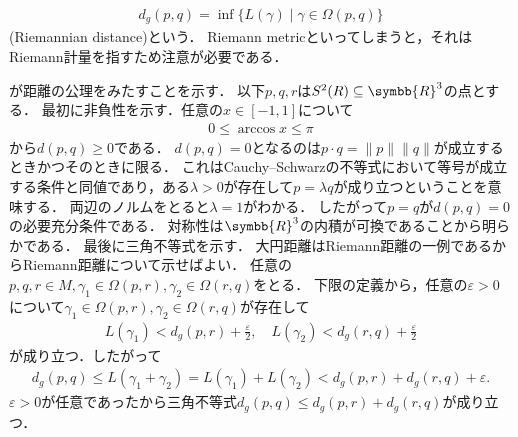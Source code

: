 \documentclass{ltjsbook}
\begin{document}
\begin{align}
    d_g(p, q) = \inf \{L(\gamma) \mid \gamma \in \Omega(p, q)\}
\end{align}
(Riemannian distance)という．
Riemann metricといってしまうと，それはRiemann計量を指すため注意が必要である．


が距離の公理をみたすことを示す．
以下\(p, q, r\)は\(S^2(R) \subseteq \symbb{R}^3\)の点とする．
最初に非負性を示す．任意の\(x \in [-1 , 1]\)について
\begin{align*}
    0 \leq \arccos x \leq \pi
\end{align*}
から\(d(p, q) \geq 0\)である．
\(d(p, q) = 0\)となるのは\(p \cdot q = \lVert p \rVert \lVert q \rVert\)が成立するときかつそのときに限る．
これはCauchy--Schwarzの不等式において等号が成立する条件と同値であり，ある\(\lambda > 0\)が存在して\(p = \lambda q\)が成り立つということを意味する．
両辺のノルムをとると\(\lambda = 1\)がわかる．
したがって\(p = q\)が\(d(p, q) = 0\)の必要充分条件である．
対称性は\(\symbb{R}^3\)の内積が可換であることから明らかである．
最後に三角不等式を示す．
大円距離はRiemann距離の一例であるからRiemann距離について示せばよい．
任意の\(p, q, r\in M, \gamma_1 \in \Omega(p, r), \gamma_2 \in \Omega(r, q)\)をとる．
下限の定義から，任意の\(\varepsilon > 0\)について\(\gamma_1 \in \Omega(p, r), \gamma_2 \in \Omega(r, q)\)が存在して
\begin{gather*}
    L(\gamma_1) < d_g(p, r) + \frac{\varepsilon}{2},
    \quad
    L(\gamma_2) < d_g(r, q) + \frac{\varepsilon}{2}
\end{gather*}
が成り立つ．したがって
\begin{align*}
    d_g(p, q) \leq L(\gamma_1 + \gamma_2)
            = L(\gamma_1) + L(\gamma_2)
            < d_g(p, r) + d_g(r, q) + \varepsilon.
\end{align*}
\(\varepsilon > 0\)が任意であったから三角不等式\(d_g(p, q) \leq d_g(p, r) + d_g(r, q)\)が成り立つ．
\end{document}

